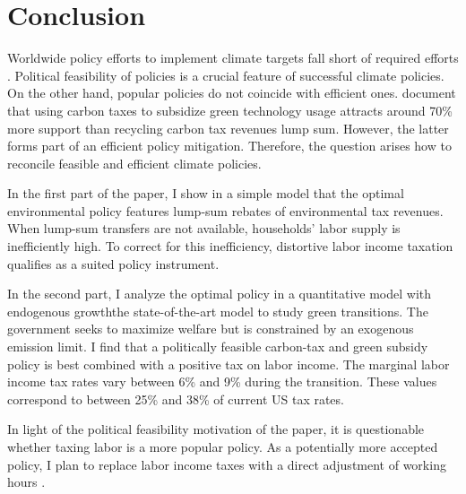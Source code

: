 \newpage
\section{Conclusion}\label{sec:con}

Worldwide policy efforts to implement climate targets fall short of required efforts \citep{IPCC2022}. Political feasibility of policies is a crucial feature of successful climate policies. On the other hand, popular policies do not coincide with efficient ones. \cite{Fabre2023Fighting} document that using carbon taxes to subsidize green technology usage attracts around 70\% more support than recycling carbon tax revenues lump sum. However, the latter forms part of an efficient policy mitigation. Therefore, the question arises how to reconcile feasible and efficient climate policies.


In the first part of the paper, I show in a simple model that the optimal environmental policy features lump-sum rebates of environmental tax revenues. When lump-sum transfers are not available, households' labor supply is inefficiently high. To correct for this inefficiency, distortive labor income taxation qualifies as a suited policy instrument. %


In the second part, I analyze the optimal policy in a quantitative model with  endogenous growth\textemdash the state-of-the-art model to study green transitions. The government seeks to maximize welfare but is constrained by an exogenous emission limit. 
I find that a politically feasible carbon-tax and green subsidy policy is best combined with a positive tax on labor income. The marginal labor income tax rates vary between 6\% and 9\% during the transition. These values correspond to between 25\% and 38\% of current US tax rates.


In light of the political feasibility motivation of the paper, it is questionable whether taxing labor is a more popular policy.  As a potentially more accepted policy, I plan to replace labor income taxes with a direct adjustment of working hours \citep{Alvarez-Cuadrado2007EnvyHours}. 

